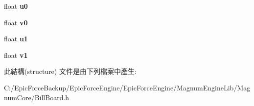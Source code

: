 \begin{DoxyCompactItemize}
\item 
float {\bfseries u0}\hypertarget{struct_magnum_1_1_bill_board_1_1_vertex_a9cef884f8ac18ce289593d02cc854eba}{}\label{struct_magnum_1_1_bill_board_1_1_vertex_a9cef884f8ac18ce289593d02cc854eba}

\item 
float {\bfseries v0}\hypertarget{struct_magnum_1_1_bill_board_1_1_vertex_af8a7f58b79900ab3cf5ebf5ca8a93acc}{}\label{struct_magnum_1_1_bill_board_1_1_vertex_af8a7f58b79900ab3cf5ebf5ca8a93acc}

\item 
float {\bfseries u1}\hypertarget{struct_magnum_1_1_bill_board_1_1_vertex_aeaf3034ce9e31b471f038af32857889c}{}\label{struct_magnum_1_1_bill_board_1_1_vertex_aeaf3034ce9e31b471f038af32857889c}

\item 
float {\bfseries v1}\hypertarget{struct_magnum_1_1_bill_board_1_1_vertex_ab90a636cd2fab253a16ca7b6078c0dd2}{}\label{struct_magnum_1_1_bill_board_1_1_vertex_ab90a636cd2fab253a16ca7b6078c0dd2}

\end{DoxyCompactItemize}


此結構(structure) 文件是由下列檔案中產生\+:\begin{DoxyCompactItemize}
\item 
C\+:/\+Epic\+Force\+Backup/\+Epic\+Force\+Engine/\+Epic\+Force\+Engine/\+Magnum\+Engine\+Lib/\+Magnum\+Core/Bill\+Board.\+h\end{DoxyCompactItemize}
